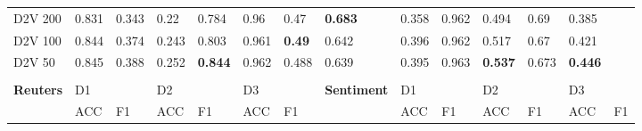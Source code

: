 {\begin{landscape}
\begin{table}[]
\begin{tabular}{llllllllllllll}
D2V 200    & 0.831                           & 0.343                           & 0.22                            & 0.784                           & 0.96                            & 0.47                            & \textbf{0.683} & 0.358                           & 0.962                           & 0.494                           & 0.69                            & 0.385                           &                                 \\
D2V 100    & 0.844                           & 0.374                           & 0.243                           & 0.803                           & 0.961                           & \textbf{0.49}  & 0.642                           & 0.396                           & 0.962                           & 0.517                           & 0.67                            & 0.421                           &                                 \\
D2V 50     & 0.845                           & 0.388                           & 0.252                           & \textbf{0.844} & 0.962                           & 0.488                           & 0.639                           & 0.395                           & 0.963                           & \textbf{0.537} & 0.673                           & \textbf{0.446} &                                 \\
&                                 &                                 &                                 &                                 &                                 &                                 &                                 &                                 &                                 &                                 &                                 &                                 &                                 \\
\textbf{Reuters}    & D1                              &                                 & D2                              &                                 & D3                              &                                 & \textbf{Sentiment}                       & D1                              &                                 & D2                              &                                 & D3                              &                                 \\
& ACC                             & F1                              & ACC                             & F1                              & ACC                             & F1                              &                                 & ACC                             & F1                              & ACC                             & F1                              & ACC                             & F1                              \\

\end{tabular}
\end{table}
\end{landscape}}
